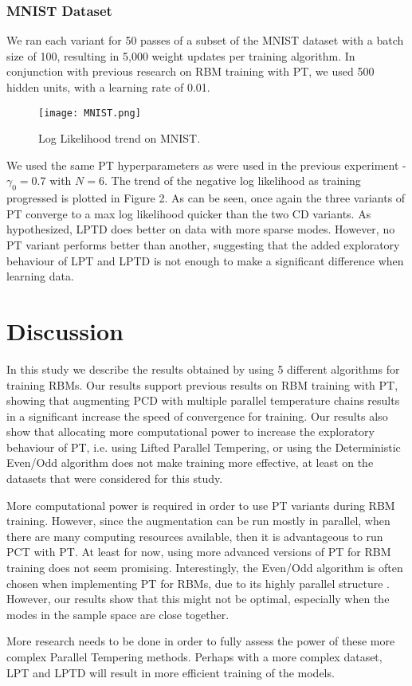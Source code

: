 \subsubsection{MNIST Dataset}
We ran each variant for 50 passes of a subset of the MNIST dataset with a batch size of 100, resulting in 5,000 weight updates per training algorithm. In conjunction with previous research on RBM training with PT, we used 500 hidden units, with a learning rate of 0.01\cite{desjardins2010tempered}. 

\begin{figure}[ht!]
	\centering
	\texttt{[image: MNIST.png]}
\caption{Log Likelihood trend on MNIST.}
\end{figure}

We used the same PT hyperparameters as were used in the previous experiment - $\gamma_0 = 0.7$ with $N=6$. The trend of the negative log likelihood as training progressed is plotted in Figure 2. As can be seen, once again the three variants of PT converge to a max log likelihood quicker than the two CD variants. As hypothesized, LPTD does better on data with more sparse modes. However, no PT variant performs better than another, suggesting that the added exploratory behaviour of LPT and LPTD is not enough to make a significant difference when learning data.  

\section{Discussion}
In this study we describe the results obtained by using 5 different algorithms for training RBMs. Our results support previous results on RBM training with PT, showing that augmenting PCD with multiple parallel temperature chains results in a significant increase the speed of convergence for training. Our results also show that allocating more computational power to increase the exploratory behaviour of PT, i.e. using Lifted Parallel Tempering, or using the Deterministic Even/Odd algorithm does not make training more effective, at least on the datasets that were considered for this study.

More computational power is required in order to use PT variants during RBM training. However, since the augmentation can be run mostly in parallel, when there are many computing resources available, then it is advantageous to run PCT with PT. At least for now, using more advanced versions of PT for RBM training does not seem promising. Interestingly, the Even/Odd algorithm is often chosen when implementing PT for RBMs, due to its highly parallel structure \cite{fischer2014training}. However, our results show that this might not be optimal, especially when the modes in the sample space are close together.

More research needs to be done in order to fully assess the power of these more complex Parallel Tempering methods. Perhaps with a more complex dataset, LPT and LPTD will result in more efficient training of the models. \\